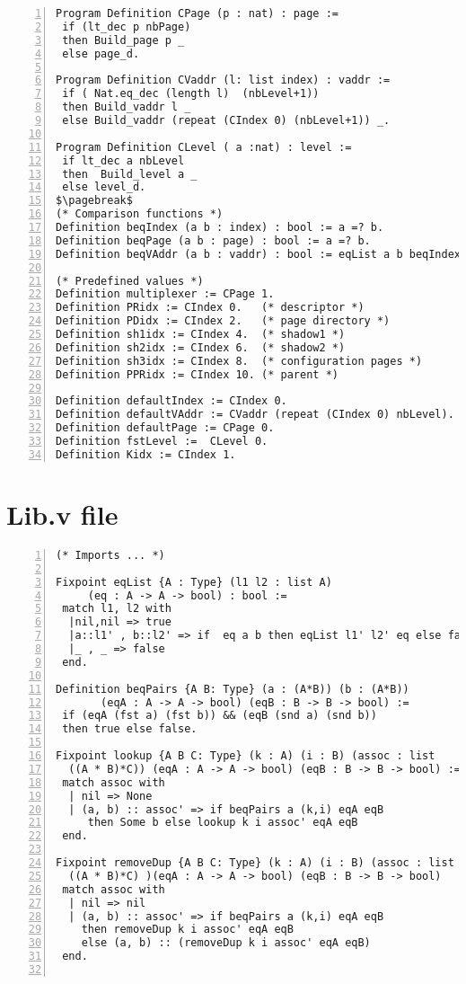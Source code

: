 \begin{appendices}
\begin{lstlisting}[xleftmargin=-.1\textwidth,
xrightmargin=-.1\textwidth,
mathescape=true,numbers=left]
Program Definition CPage (p : nat) : page := 
 if (lt_dec p nbPage) 
 then Build_page p _ 
 else page_d.

Program Definition CVaddr (l: list index) : vaddr := 
 if ( Nat.eq_dec (length l)  (nbLevel+1))  
 then Build_vaddr l _
 else Build_vaddr (repeat (CIndex 0) (nbLevel+1)) _.

Program Definition CLevel ( a :nat) : level := 
 if lt_dec a nbLevel 
 then  Build_level a _ 
 else level_d.
$\pagebreak$
(* Comparison functions *)
Definition beqIndex (a b : index) : bool := a =? b.
Definition beqPage (a b : page) : bool := a =? b.
Definition beqVAddr (a b : vaddr) : bool := eqList a b beqIndex.

(* Predefined values *)
Definition multiplexer := CPage 1.
Definition PRidx := CIndex 0.   (* descriptor *)
Definition PDidx := CIndex 2.   (* page directory *)
Definition sh1idx := CIndex 4.  (* shadow1 *) 
Definition sh2idx := CIndex 6.  (* shadow2 *)
Definition sh3idx := CIndex 8.  (* configuration pages *)
Definition PPRidx := CIndex 10. (* parent *)

Definition defaultIndex := CIndex 0.
Definition defaultVAddr := CVaddr (repeat (CIndex 0) nbLevel).
Definition defaultPage := CPage 0.
Definition fstLevel :=  CLevel 0.
Definition Kidx := CIndex 1.
\end{lstlisting}
\pagebreak
\section{Lib.v file} \label{LibFile}
\begin{lstlisting}[xleftmargin=-.1\textwidth,
xrightmargin=-.1\textwidth,
mathescape=true,numbers=left]
(* Imports ... *)

Fixpoint eqList {A : Type} (l1 l2 : list A) 
	 (eq : A -> A -> bool) : bool := 
 match l1, l2 with 
  |nil,nil => true
  |a::l1' , b::l2' => if  eq a b then eqList l1' l2' eq else false
  |_ , _ => false
 end.

Definition beqPairs {A B: Type} (a : (A*B)) (b : (A*B)) 
	   (eqA : A -> A -> bool) (eqB : B -> B -> bool) :=
 if (eqA (fst a) (fst b)) && (eqB (snd a) (snd b))  
 then true else false.

Fixpoint lookup {A B C: Type} (k : A) (i : B) (assoc : list 
  ((A * B)*C)) (eqA : A -> A -> bool) (eqB : B -> B -> bool) :=
 match assoc with
  | nil => None  
  | (a, b) :: assoc' => if beqPairs a (k,i) eqA eqB 
  	 then Some b else lookup k i assoc' eqA eqB
 end. 
 
Fixpoint removeDup {A B C: Type} (k : A) (i : B) (assoc : list 
  ((A * B)*C) )(eqA : A -> A -> bool) (eqB : B -> B -> bool)   :=
 match assoc with
  | nil => nil
  | (a, b) :: assoc' => if beqPairs a (k,i) eqA eqB 
  	then removeDup k i assoc' eqA eqB 
  	else (a, b) :: (removeDup k i assoc' eqA eqB)
 end.


\end{lstlisting}
\end{appendices}

